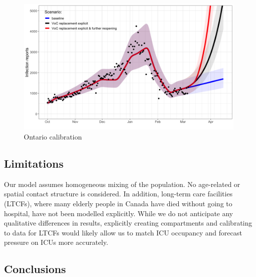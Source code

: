 \documentclass[12pt]{article}\usepackage[]{graphicx}\usepackage[]{color}
\begin{document}
\FloatBarrier


\begin{figure}[ht!]
\color{fgcolor}
\includegraphics[width=\maxwidth]{code/cachestuff/ontario_voc.png} 

\caption{Ontario calibration}
\label{fig:Ont_voc}
\end{figure}

\FloatBarrier


\subsection{Limitations}

Our model assumes homogeneous mixing of the population.  No
age-related or spatial contact structure is considered.  In addition,
long-term care facilities (LTCFs), where many elderly people in Canada
have died without going to hospital, have not been modelled
explicitly.  While we do not anticipate any qualitative differences in
results, explicitly creating compartments and calibrating to data for
LTCFs would likely allow us to match ICU occupancy and forecast
pressure on ICUs more accurately.

\subsection{Conclusions}

\end{document}
